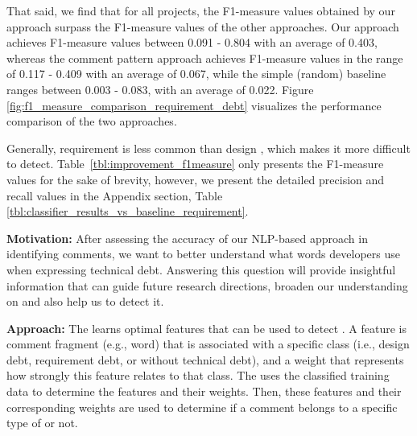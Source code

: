 That said, we find that for all projects, the F1-measure values obtained by our approach surpass the F1-measure values of the other approaches. Our approach achieves F1-measure values between 0.091 - 0.804 with an average of 0.403, whereas the comment pattern approach achieves F1-measure values in the range of 0.117 - 0.409 with an average of 0.067, while the simple (random) baseline ranges between 0.003 - 0.083, with an average of 0.022. Figure \ref{fig:f1_measure_comparison_requirement_debt} visualizes the performance comparison of the two approaches.

Generally, requirement \SATD is less common than design \SATD, which makes it more difficult to detect. Table~\ref{tbl:improvement_f1measure} only presents the F1-measure values for the sake of brevity, however, we present the detailed precision and recall values in the Appendix section, Table \ref{tbl:classifier_results_vs_baseline_requirement}.


\vspace{3mm}
\noindent\rqii
\vspace{3mm}

\noindent \textbf{Motivation:} After assessing the accuracy of our NLP-based approach in identifying \SATD comments, we want to better understand what words developers use when expressing technical debt. Answering this question will provide insightful information that can guide future research directions, broaden our understanding on \SATD and also help us to detect it.     

\vspace{1mm}
\noindent \textbf{Approach:} The  learns optimal features that can be used to detect \SATD. A feature is comment fragment (e.g., word) that is associated with a specific class (i.e., design debt, requirement debt, or without technical debt), and a weight that represents how strongly this feature relates to that class. The  uses the classified training data to determine the features and their weights. Then, these features and their corresponding weights are used to determine if a comment belongs to a specific type of \SATD or not.

